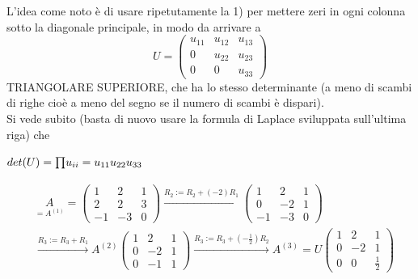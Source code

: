 L'idea come noto è di usare ripetutamente la 1) per mettere zeri in ogni colonna sotto la diagonale principale, in modo da arrivare a 
\begin{equation*}
    U = \begin{pmatrix}
        u_{11} & u_{12} & u_{13} \\
        0 & u_{22} & u_{23} \\
        0 & 0 & u_{33}
    \end{pmatrix}
\end{equation*}
TRIANGOLARE SUPERIORE, che ha lo stesso determinante (a meno di scambi di righe cioè a meno del segno se il numero di scambi è dispari).\\
Si vede subito (basta di nuovo usare la formula di Laplace sviluppata sull'ultima riga) che
\begin{center}
    $det(U) = \begin{matrix}\prod\end{matrix} u_{ii} = u_{11} u_{22} u_{33}$
\end{center}
\begin{equation*}
    \begin{split}
        & \underset{=A^{(1)}}{A}=\begin{pmatrix}
              1 & 2 & 1 \\
              2 & 2 & 3 \\
              -1 & -3 & 0
        \end{pmatrix} \overset{R_2 := R_2 + (-2) R_1}{\longrightarrow} \begin{pmatrix}
                  1 & 2 & 1 \\
                  0 & -2 & 1 \\
                 -1 & -3 & 0
        \end{pmatrix} \\
        & \overset{R_3 := R_3 + R_1}{\longrightarrow} A^{(2)} \begin{pmatrix}
                  1 & 2 & 1 \\
                  0 & -2 & 1 \\
                  0 & -1 & 1
        \end{pmatrix} \overset{R_3 := R_3 + ( -\frac{1}{2}) R_2}{\longrightarrow} A^{(3)} = U \begin{pmatrix}
                  1 & 2 & 1 \\
                  0 & -2 & 1 \\
                  0 & 0 & \frac{1}{2}
        \end{pmatrix}
    \end{split}
\end{equation*}
